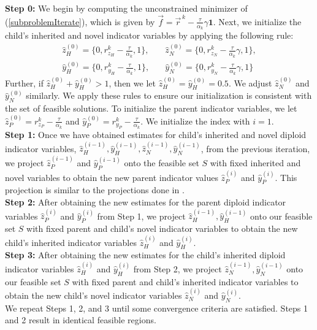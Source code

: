 \noindent \textbf{Step 0:} We begin by computing the unconstrained minimizer of (\ref{subproblemIterate}), which is given by $\vec{f} = \vec{r}^{\,k} - \frac{\tau}{\alpha_k}\gamma\mathbf{1}$. %
Next,  we initialize the child's inherited and novel indicator variables by applying the following rule:
\begin{equation*}
	\begin{aligned}
		\hat{z}_H^{(0)} = \{0,r_{z_H}^k - \frac{\tau}{\alpha_k},1 \}, & \quad \hat{z}_N^{(0)} = \{0,r_{z_N}^k - \frac{\tau}{\alpha_k}\gamma,1 \},\\
		\hat{y}_H^{(0)} = \{0,r_{y_H}^k - \frac{\tau}{\alpha_k},1 \}, &
		\quad \hat{y}_N^{(0)} = \{0,r_{y_N}^k - \frac{\tau}{\alpha_k}\gamma,1 \}
	\end{aligned}
\end{equation*}
Further, if $\hat{z}_H^{(0)} + \hat{y}_H^{(0)}>1$, then we let $\hat{z}_H^{(0)} = \hat{y}_H^{(0)} = 0.5$. We adjust $\hat{z}_N^{(0)}$ and $\hat{y}_N^{(0)}$ similarly. We apply these rules to ensure our initialization is consistent with the set of feasible solutions. To initialize the parent indicator variables, we let $\hat{z}_P^{(0)} = r_{z_P}^k - \frac{\tau}{\alpha_k}$ and $\hat{y}_P^{(0)} = r_{y_P}^k - \frac{\tau}{\alpha_k}$. 
We initialize the index with $i=1$. \\

\noindent \textbf{Step 1:} Once we have obtained estimates for child's inherited and novel diploid indicator variables, $\hat{z}_H^{(i-1)}, \hat{y}_H^{(i-1)}, \hat{z}_N^{(i-1)}, \hat{y}_N^{(i-1)}$, from the previous iteration, we project $\hat{z}_P^{(i-1)}$ and $\hat{y}_P^{(i-1)}$ onto the feasible set $S$ with fixed inherited and novel variables to obtain the new parent indicator values $\hat{z}_P^{(i)}$ and $\hat{y}_P^{(i)}$. This projection is similar to the projections done in \cite{MB_SingleParentDiploid, MB_diploidTrios}. \\

\noindent \textbf{Step 2:} After obtaining the new estimates for the parent diploid indicator variables $\hat{z}_P^{(i)}$ and $\hat{y}_P^{(i)}$ from Step 1, we project $\hat{z}_H^{(i-1)}, \hat{y}_H^{(i-1)}$ onto our feasible set $S$ with fixed parent and child's novel indicator variables to obtain the new child's inherited indicator variables $\hat{z}_H^{(i)}$ and $\hat{y}_H^{(i)}$.\\ 

\noindent \textbf{Step 3:} After obtaining the new estimates for the child's inherited diploid indicator variables $\hat{z}_H^{(i)}$ and $\hat{y}_H^{(i)}$ from Step 2, we project $\hat{z}_N^{(i-1)}, \hat{y}_N^{(i-1)}$ onto our feasible set $S$ with fixed parent and child's inherited indicator variables to obtain the new child's novel indicator variables $\hat{z}_N^{(i)}$ and $\hat{y}_N^{(i)}$. \\

We repeat Steps 1, 2, and 3 until some convergence criteria are satisfied. Steps 1 and 2  result in identical feasible regions. 